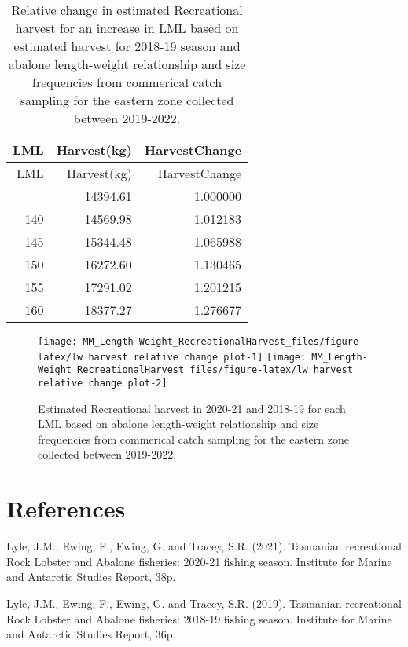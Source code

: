 \documentclass[
  11pt,
]{article}
\begin{document}
\begin{longtable}[]{@{}rrr@{}}
\caption{Relative change in estimated Recreational harvest for an
increase in LML based on estimated harvest for 2018-19 season and
abalone length-weight relationship and size frequencies from commerical
catch sampling for the eastern zone collected between
2019-2022.}\tabularnewline
\toprule\noalign{}
LML & Harvest(kg) & HarvestChange \\
\midrule\noalign{}
\endfirsthead
\toprule\noalign{}
LML & Harvest(kg) & HarvestChange \\
\midrule\noalign{}
\endhead
\bottomrule\noalign{}
\endlastfoot
138 & 14394.61 & 1.000000 \\
140 & 14569.98 & 1.012183 \\
145 & 15344.48 & 1.065988 \\
150 & 16272.60 & 1.130465 \\
155 & 17291.02 & 1.201215 \\
160 & 18377.27 & 1.276677 \\
\end{longtable}

\begin{figure}

{\centering \texttt{[image: MM\_Length-Weight\_RecreationalHarvest\_files/figure-latex/lw harvest relative change plot-1]} \texttt{[image: MM\_Length-Weight\_RecreationalHarvest\_files/figure-latex/lw harvest relative change plot-2]} 

}

\caption{Estimated Recreational harvest in 2020-21 and 2018-19 for each LML based on abalone length-weight relationship and size frequencies from commerical catch sampling for the eastern zone collected between 2019-2022.}\label{fig:lw harvest relative change plot}
\end{figure}

\section{References}\label{references}

Lyle, J.M., Ewing, F., Ewing, G. and Tracey, S.R. (2021). Tasmanian
recreational Rock Lobster and Abalone fisheries: 2020-21 fishing season.
Institute for Marine and Antarctic Studies Report, 38p.

Lyle, J.M., Ewing, F., Ewing, G. and Tracey, S.R. (2019). Tasmanian
recreational Rock Lobster and Abalone fisheries: 2018-19 fishing season.
Institute for Marine and Antarctic Studies Report, 36p.
\end{document}
